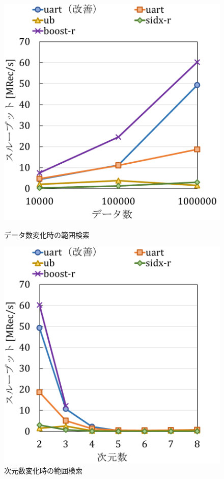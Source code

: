 \begin{figure}[tb]
  \begin{minipage}[c]{0.495\textwidth}
    \centering
    \includegraphics[scale=0.5]{./figures/graph-scan-datasize.pdf}
    \caption{データ数変化時の範囲検索}
    \label{graph:rec-sc}
  \end{minipage}
  \begin{minipage}[c]{0.495\textwidth}
    \centering
    \includegraphics[scale=0.5]{./figures/graph-scan-dimenntion.pdf}
    \caption{次元数変化時の範囲検索}
    \label{graph:dim-sc}
  \end{minipage}
\end{figure}
